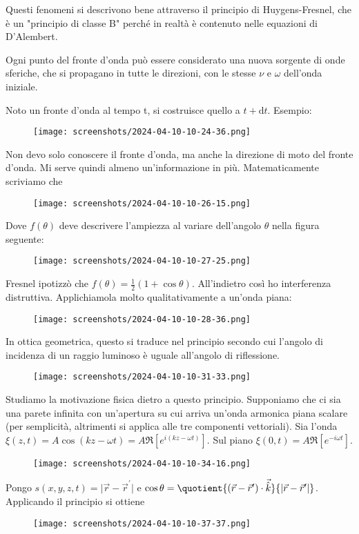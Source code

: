 Questi fenomeni si descrivono bene attraverso il principio di Huygens-Fresnel, che è un "principio di classe B" perché in realtà è contenuto nelle equazioni di D'Alembert.
\begin{theorem}
	Ogni punto del fronte d'onda può essere considerato una nuova sorgente di onde sferiche, che si propagano in tutte le direzioni, con le stesse \(\nu \) e \(\omega \) dell'onda iniziale.
\end{theorem}
Noto un fronte d'onda al tempo t, si costruisce quello a \(t+ \mathrm{d} t\). Esempio:
\begin{figure}[H]
	\centering
	\texttt{[image: screenshots/2024-04-10-10-24-36.png]}
\end{figure}
Non devo solo conoscere il fronte d'onda, ma anche la direzione di moto del fronte d'onda. Mi serve quindi almeno un'informazione in più. Matematicamente scriviamo che
\begin{figure}[H]
	\centering
	\texttt{[image: screenshots/2024-04-10-10-26-15.png]}
\end{figure}
Dove \(f(\theta )\) deve descrivere l'ampiezza al variare dell'angolo \(\theta \) nella figura seguente:
\begin{figure}[H]
	\centering
	\texttt{[image: screenshots/2024-04-10-10-27-25.png]}
\end{figure}
Fresnel ipotizzò che \(f(\theta )= \frac{1}{2}(1+ \cos \theta )\). All'indietro così ho interferenza distruttiva. Applichiamola molto qualitativamente a un'onda piana:
\begin{figure}[H]
	\centering
	\texttt{[image: screenshots/2024-04-10-10-28-36.png]}
\end{figure}
In ottica geometrica, questo si traduce nel principio secondo cui l'angolo di incidenza di un raggio luminoso è uguale all'angolo di riflessione.
\begin{figure}[H]
	\centering
	\texttt{[image: screenshots/2024-04-10-10-31-33.png]}
\end{figure}
Studiamo la motivazione fisica dietro a questo principio. Supponiamo che ci sia una parete infinita con un'apertura su cui arriva un'onda armonica piana scalare (per semplicità, altrimenti si applica alle tre componenti vettoriali). Sia l'onda \(\xi (z,t)=A \cos (kz-\omega t)=A \Re [e^{i(kz - \omega t)}]\). Sul piano \(\xi (0,t)= A \Re [e^{-i \omega t} ]\).
\begin{figure}[H]
	\centering
	\texttt{[image: screenshots/2024-04-10-10-34-16.png]}
\end{figure}
Pongo \(s(x,y,z,t)= \vert \vec{r}-\vec{r}^{\prime} \vert \) e \(\cos \theta = \quotient{(\vec{r}-\vec{r}^{\prime} )\cdot \vec{\hat{k}}}{\vert \vec{r}-\vec{r}^{\prime} \vert } \). Applicando il principio si ottiene
\begin{figure}[H]
	\centering
	\texttt{[image: screenshots/2024-04-10-10-37-37.png]}
\end{figure}
